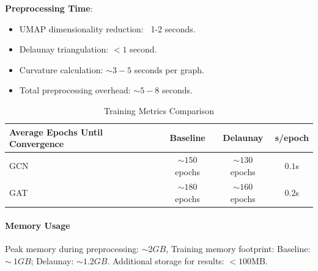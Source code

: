 \documentclass{article}
\theoremstyle{plain}
\theoremstyle{definition}
\theoremstyle{remark}
\begin{document}
\textbf{Preprocessing Time}:
\begin{itemize} 
    \item UMAP dimensionality reduction: ~1-2 seconds.
    \item Delaunay triangulation: $< 1$ second.
    \item Curvature calculation: $\sim 3-5$ seconds per graph.
    \item Total preprocessing overhead: $\sim 5-8$ seconds.
\end{itemize}

\begin{table}[h!]
\caption{Training Metrics Comparison}
\centering
\begin{tabular}{|l|c|c|c|}
\hline
\textbf{Average Epochs Until Convergence} & \textbf{Baseline} & \textbf{Delaunay} & \textbf{s/epoch}\\ \hline
GCN                          & $\sim 150$ epochs       & $\sim 130$ epochs       & $0.1$s\\ \hline
GAT                          & $\sim 180$ epochs       & $\sim 160$ epochs       & $0.2$s\\ \hline

\end{tabular}
\label{tab:training_metrics}
\end{table}

\paragraph{Memory Usage}
Peak memory during preprocessing: $\sim 2GB$, Training memory footprint: Baseline: $\sim~1GB$;
Delaunay: $\sim 1.2GB$. Additional storage for results: $< 100$MB.

\end{document}
